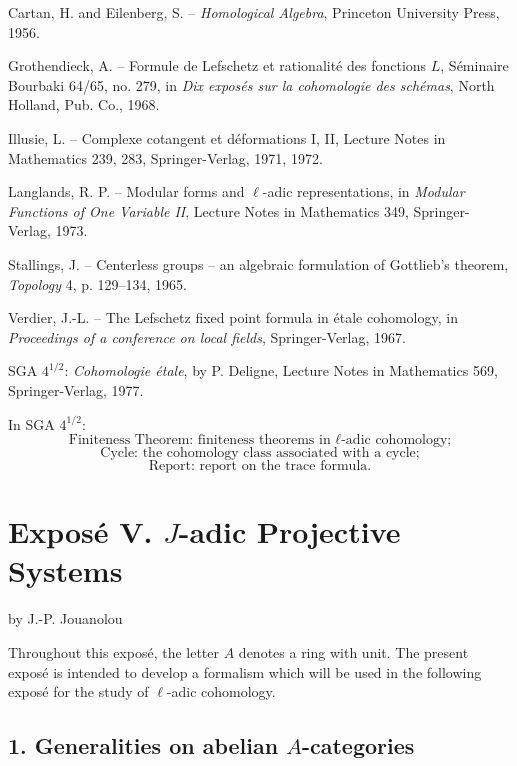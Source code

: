 \documentclass[11pt]{article}
\begin{document}
\begin{enumerate}[label={[\arabic*]}]
\item Cartan, H. and Eilenberg, S. -- \textit{Homological Algebra}, Princeton University Press, 1956.
\item Grothendieck, A. -- Formule de Lefschetz et rationalité des fonctions $L$, Séminaire Bourbaki 64/65, no. 279, in \textit{Dix exposés sur la cohomologie des schémas}, North Holland, Pub. Co., 1968.
\item Illusie, L. -- Complexe cotangent et déformations I, II, Lecture Notes in Mathematics 239, 283, Springer-Verlag, 1971, 1972.
\item Langlands, R. P. -- Modular forms and $\ell$-adic representations, in \textit{Modular Functions of One Variable II}, Lecture Notes in Mathematics 349, Springer-Verlag, 1973.
\item Stallings, J. -- Centerless groups -- an algebraic formulation of Gottlieb's theorem, \textit{Topology} 4, p. 129--134, 1965.
\item Verdier, J.-L. -- The Lefschetz fixed point formula in étale cohomology, in \textit{Proceedings of a conference on local fields}, Springer-Verlag, 1967.
\end{enumerate}

SGA $4^{1/2}$: \textit{Cohomologie étale}, by P. Deligne, Lecture Notes in Mathematics 569, Springer-Verlag, 1977.

In SGA $4^{1/2}$:
\[
\text{Finiteness Theorem: finiteness theorems in }\ell\text{-adic cohomology;}
\]
\[
\text{Cycle: the cohomology class associated with a cycle;}
\]
\[
\text{Report: report on the trace formula.}
\]


\section*{Exposé V. $J$-adic Projective Systems}
\begin{center}by J.-P. Jouanolou\end{center}

Throughout this exposé, the letter $A$ denotes a ring with unit. The present exposé is intended to develop a formalism which will be used in the following exposé for the study of $\ell$-adic cohomology.

\subsection*{1. Generalities on abelian $A$-categories}
\end{document}
